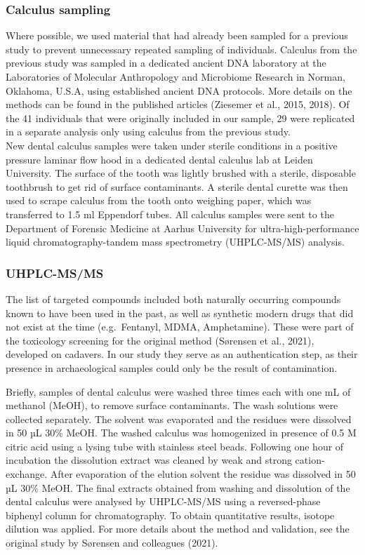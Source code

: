 \documentclass[
]{article}
\begin{document}
\hypertarget{calculus-sampling}{%
\subsubsection{Calculus sampling}\label{calculus-sampling}}

Where possible, we used material that had already been sampled for a
previous study to prevent unnecessary repeated sampling of individuals.
Calculus from the previous study was sampled in a dedicated ancient DNA
laboratory at the Laboratories of Molecular Anthropology and Microbiome
Research in Norman, Oklahoma, U.S.A, using established ancient DNA
protocols. More details on the methods can be found in the published
articles (Ziesemer et al., 2015, 2018). Of the 41 individuals that were
originally included in our sample, 29 were replicated in a separate
analysis only using calculus from the previous study.\\
New dental calculus samples were taken under sterile conditions in a
positive pressure laminar flow hood in a dedicated dental calculus lab
at Leiden University. The surface of the tooth was lightly brushed with
a sterile, disposable toothbrush to get rid of surface contaminants. A
sterile dental curette was then used to scrape calculus from the tooth
onto weighing paper, which was transferred to 1.5 ml Eppendorf tubes.
All calculus samples were sent to the Department of Forensic Medicine at
Aarhus University for ultra-high-performance liquid
chromatography-tandem mass spectrometry (UHPLC-MS/MS) analysis.

\hypertarget{uhplc-msms}{%
\subsubsection{UHPLC-MS/MS}\label{uhplc-msms}}

The list of targeted compounds included both naturally occurring
compounds known to have been used in the past, as well as synthetic
modern drugs that did not exist at the time (e.g.~Fentanyl, MDMA,
Amphetamine). These were part of the toxicology screening for the
original method (Sørensen et al., 2021), developed on cadavers. In our
study they serve as an authentication step, as their presence in
archaeological samples could only be the result of contamination.

Briefly, samples of dental calculus were washed three times each with
one mL of methanol (MeOH), to remove surface contaminants. The wash
solutions were collected separately. The solvent was evaporated and the
residues were dissolved in 50 µL 30\% MeOH. The washed calculus was
homogenized in presence of 0.5 M citric acid using a lysing tube with
stainless steel beads. Following one hour of incubation the dissolution
extract was cleaned by weak and strong cation-exchange. After
evaporation of the elution solvent the residue was dissolved in 50 µL
30\% MeOH. The final extracts obtained from washing and dissolution of
the dental calculus were analysed by UHPLC-MS/MS using a reversed-phase
biphenyl column for chromatography. To obtain quantitative results,
isotope dilution was applied. For more details about the method and
validation, see the original study by Sørensen and colleagues (2021).
\end{document}
